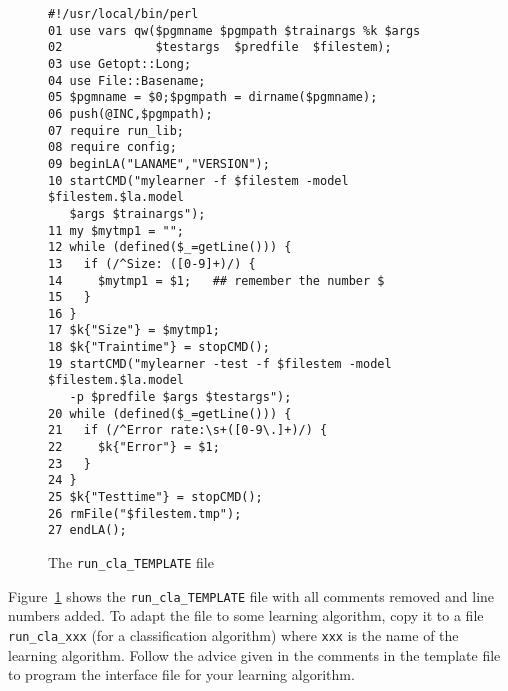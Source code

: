 \documentclass[a4paper,10pt,twoside]{article}
\begin{document}
\begin{figure}[!hptb]
{\footnotesize
\begin{verbatim}
#!/usr/local/bin/perl
01 use vars qw($pgmname $pgmpath $trainargs %k $args 
02             $testargs  $predfile  $filestem);
03 use Getopt::Long;
04 use File::Basename;
05 $pgmname = $0;$pgmpath = dirname($pgmname);
06 push(@INC,$pgmpath);
07 require run_lib;
08 require config;
09 beginLA("LANAME","VERSION"); 
10 startCMD("mylearner -f $filestem -model $filestem.$la.model 
   $args $trainargs");
11 my $mytmp1 = "";
12 while (defined($_=getLine())) {
13   if (/^Size: ([0-9]+)/) {  
14     $mytmp1 = $1;   ## remember the number $
15   }
16 }
17 $k{"Size"} = $mytmp1;
18 $k{"Traintime"} = stopCMD();
19 startCMD("mylearner -test -f $filestem -model $filestem.$la.model 
   -p $predfile $args $testargs");
20 while (defined($_=getLine())) {
21   if (/^Error rate:\s+([0-9\.]+)/) {
22     $k{"Error"} = $1;
23   }
24 }
25 $k{"Testtime"} = stopCMD();
26 rmFile("$filestem.tmp");
27 endLA();
\end{verbatim}
}
\caption[]{The \texttt{run\_cla\_TEMPLATE} file}
\label{fig:template1}
\end{figure}
Figure~\ref{fig:template1} shows the \texttt{run\_cla\_TEMPLATE}
file with all comments removed and line numbers added. To adapt
the file to some learning algorithm, copy it to a file 
\texttt{run\_cla\_xxx} (for a classification algorithm) where
\texttt{xxx} is the name of the learning algorithm.
Follow the advice given in the comments in the template file to
program the interface file for your learning algorithm.
\end{document}
